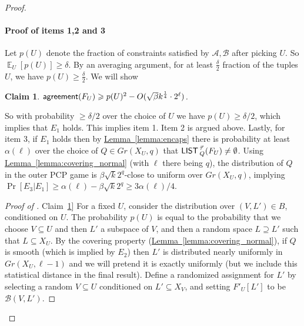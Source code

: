 \documentclass[11pt]{article}
\numberwithin{equation}{section}
\newtheorem{claim}[theorem]{Claim}
\theoremstyle{definition}
\theoremstyle{plain}
\newcommand{\expref}[2]{\hyperref[#2]{#1~\ref{#2}}}
\newcommand\Expect[2]{{\mathop{\mathbb{E}}_{#1}\left[ {#2} \right]}}
\renewcommand\geq{\geqslant}
\renewcommand\ge{\geqslant}
\renewcommand\subset{\subseteq}
\renewcommand\supset{\supseteq}
\def\M{{\sf LIST\,}}
\def\A{\mathcal{A}}
\def\B{\mathcal{B}}
\def\agr{{\sf agreement}}
\begin{document}
\begin{proof}
\paragraph{Proof of items 1,2 and 3}
Let $p(U)$ denote the fraction of constraints satisfied by $\A,\B$
after picking $U$.  So  $\Expect{U}{p(U)}\geq \delta$.  By an
averaging argument, for at least $\frac{\delta}{2}$ fraction of the
tuples $U$, we have $p(U) \geq \frac{\delta}{2}$.  We will show
\begin{claim}\label{claim:high-agr}
$\agr(F_U) \geq p(U)^2 - O(\sqrt{\beta} k^{\frac{1}{4}} \cdot 2^{\ell})$.
\end{claim}
So with probability $\ge\delta/2$ over the choice of $U$ we have $p(U)\ge\delta/2$,  which implies that  $E_1$ holds.
This implies item 1. Item 2 is argued above. %
Lastly, for item 3, if $E_1$ holds then by \expref{Lemma}{lemma:encaps} there is probability at least $\alpha(\ell)$ over the choice of $Q\in Gr(X_U,q)$ that $\M^{\vec\tau}_Q(F_U)\neq\emptyset$.
Using \expref{Lemma}{lemma:covering_normal} (with $\ell$ there being $q$), the distribution of $Q$ in the outer PCP game is $\beta\sqrt{k}2^{q}$-close to uniform over $Gr(X_U,q)$, implying
$\Pr{}[E_3|E_1]\geq \alpha(\ell)-\beta\sqrt{k}2^{q}\geq 3\alpha(\ell)/4$.
%
%

\begin{proof}[Proof of \expref{Claim}{claim:high-agr}]
For a fixed $U$, consider the distribution over $(V,L')\in B$, conditioned on $U$. The probability $p(U)$ is equal to the probability that we choose $V\subset U$ and then $L'$ a subspace of $V$, and then a random space $L\supset L'$ such that $L\subset X_U$.
By the covering property (\expref{Lemma}{lemma:covering_normal}), if $Q$ is smooth (which is implied by $E_2$) then $L'$ is distributed nearly uniformly in $Gr(X_U,\ell-1)$ and we will pretend it is exactly uniformly (but we include this statistical distance in the final result). Define a randomized assignment for $L'$ by selecting a random $V\subset U$ conditioned on $L' \subset X_V$, and setting $F'_U[L']$ to be $\B(V,L')$.


\end{proof}
\end{proof}
\end{document}
